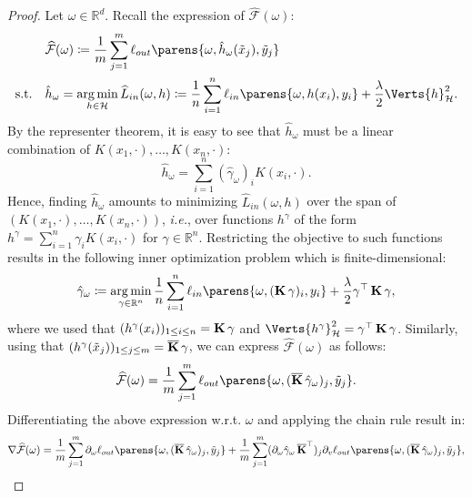 \begin{proof}
{Let $\omega\in\mathbb{R}^d$.} Recall the expression of $\widehat{\mathcal{F}}(\omega)$:
\begin{align*}
	&\widehat{\mathcal{F}}(\omega) \coloneqq \frac{1}{m}\sum_{j=1}^m \ell_{out}\parens{\omega, \hat{h}_{\omega}(\tilde{x}_j),\tilde{y}_j}\\
	\text{s.t.}\quad&\hat{h}_{\omega}=\argmin_{h\in \mathcal{H}} \widehat{L}_{in}(\omega,h)\coloneqq\frac{1}{n}\sum_{i=1}^n\ell_{in}\parens{\omega, h(x_i), y_i} +\frac{\lambda}{2}\Verts{h}_{\mathcal{H}}^2. 
\end{align*}
By the representer theorem, it is easy to see that $\hat{h}_{\omega}$ must be a linear combination of $K(x_1,\cdot),\ldots,K(x_n,\cdot)$:
\begin{equation}\label{eq:h}
	\hat{h}_{\omega} = \sum_{i=1}^n (\hat{\gamma}_{\omega})_i K(x_i,\cdot).
\end{equation}
Hence, finding $\hat{h}_{\omega}$ amounts to minimizing $\widehat{L}_{in}(\omega,h)$ over the span of $(K(x_1,\cdot),\ldots, K(x_n,\cdot))$, \textit{i.e.}, over functions $h^{\gamma}$ of the form $h^{\gamma} = \sum_{i=1}^n \gamma_i K(x_i,\cdot)$ for $\gamma\in \mathbb{R}^n$. Restricting the objective to such functions results in the following inner optimization problem which is finite-dimensional:
\begin{align*}
	\hat{\gamma}_{\omega}\coloneqq \argmin_{\gamma\in \mathbb{R}^n} \frac{1}{n}\sum_{i=1}^n \ell_{in}\parens{\omega, (\K \gamma)_i, y_i }+\frac{\lambda}{2} \gamma^{\top}\K \gamma ,
\end{align*} 
where  we used that $(h^{\gamma}(x_i))_{1\leq i\leq n} = \operatorname{\mathbf{K}}\gamma$ and $\Verts{h^{\gamma}}^2_{\mathcal{H}} = \gamma^{\top}\K \gamma$. 
Similarly, using that $(h^{\gamma}(\tilde{x}_j))_{1\leq j\leq m} = \operatorname{\mathbf{\overline{K}}}\gamma$, we can express $\widehat{\mathcal{F}}(\omega)$ as follows:
\begin{align*}
	\widehat{\mathcal{F}}(\omega) = \frac{1}{m}\sum_{j=1}^m \ell_{out}\parens{\omega, (\Kbar \hat{\gamma}_{\omega})_j,\tilde{y}_j}.
\end{align*}
Differentiating the above expression w.r.t. $\omega$ and applying the chain rule result in:
\begin{align*}
	\nabla \widehat{\mathcal{F}}(\omega) = \frac{1}{m}\sum_{j=1}^m \partial_{\omega}\ell_{out}\parens{\omega, (\Kbar \hat{\gamma}_{\omega})_j,\tilde{y}_j}  + \frac{1}{m}\sum_{j=1}^m  (\partial_{\omega}\hat{\gamma}_{\omega}\Kbar^{\top})_j \partial_{v}\ell_{out} \parens{\omega, (\Kbar \hat{\gamma}_{\omega})_j,\tilde{y}_j},

\end{align*}
\end{proof}
